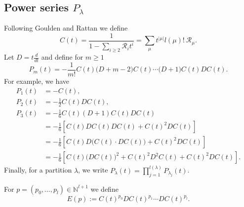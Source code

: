 \documentclass[12pt]{amsart}
\theoremstyle{plain}
\theoremstyle{remark}
\newcommand{\N}{\mathbb{N}}
\begin{document}
\subsection{Power series $P_\lambda$}
Following Goulden and Rattan \cite{GouldenRattan2007} we define
\begin{equation} C(t)=\frac{1}{1-\sum_{i\geq 2}\mathcal{R}_i t^i} = 
\sum_{\mu} t^{|\mu|} l(\mu)!\ \mathcal{R}_\mu.
\end{equation}
Let $D=t \frac{d}{dt}$
and define for $m\geq 1$
$$
P_m(t)=-\frac{1}{m!}C(t)\big(D+m-2\big)C(t)\cdots
\big(D+1\big)C(t)DC(t).$$
For example, we have
\begin{align}
\nonumber P_1(t)&=-C(t),\\ 
\nonumber P_2(t)&=-\frac{1}{2}C(t)DC(t),\\
\nonumber
P_3(t)&
=-\frac{1}{6}
C(t)(D+1)C(t)DC(t) \\
\nonumber &= -\frac{1}{6}\left[C(t)DC(t)DC(t) + C(t)^2DC(t)\right] \\
\nonumber &= 
-\frac{1}{6}
\left[C(t)D\big(C(t)\cdot DC(t)\big) + C(t)^2DC(t)\right] \\
\nonumber &=
-\frac{1}{6}\left[C(t)\big(DC(t)\big)^2+C(t)^2D^2C(t)+C(t)^2DC(t)\right] .
\end{align}
Finally, for a partition $\lambda$, we
write $P_{\lambda}(t)=\prod_{j=1}^{l(\lambda)} P_{\lambda_j}(t)$.

For $p = (p_0,\dots,p_l) \in \N^{l+1}$ we define
$$ E(p) := C(t)^{p_0} D C(t)^{p_1} \cdots D C(t)^{p_l}. $$
\end{document}

